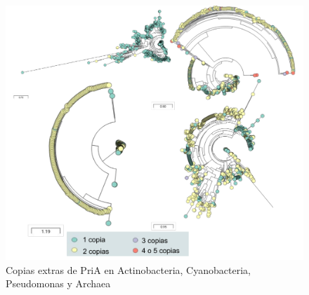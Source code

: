 \documentclass[12pt,twoside]{reedthesis}
\begin{document}
  \begin{figure}[h!tbp]
  \centering
  \includegraphics[angle = 0,scale = 1]{chapter4/PriAEvoMiningCopies.pdf}
  \caption[Copias extras de PriA en Actinobacteria, Cyanobacteria, Pseudomonas y Archaea]{\normalsize{Copias extras de PriA en Actinobacteria, Cyanobacteria, Pseudomonas y Archaea}}
  \label{fig:Expansiones de PriA en Actinobacteria, Cyanobacteria, Pseudomonas y Archaea}
  \end{figure}
  
\end{document}
